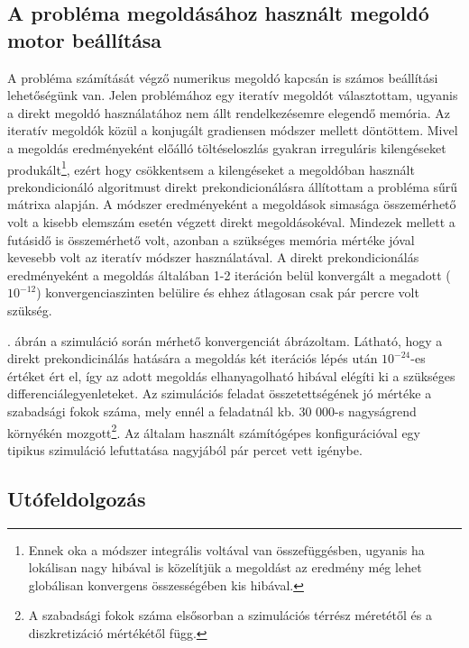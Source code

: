 \subsection{A probléma megoldásához használt megoldó motor beállítása}

A probléma számítását végző numerikus megoldó kapcsán is számos beállítási lehetőségünk van. Jelen problémához egy iteratív megoldót választottam, ugyanis a direkt megoldó használatához nem állt rendelkezésemre elegendő memória. Az iteratív megoldók közül a konjugált gradiensen módszer\cite{conjugate} mellett döntöttem. Mivel a megoldás eredményeként előálló töltéseloszlás gyakran irreguláris kilengéseket produkált\footnote{Ennek oka a módszer integrális voltával van összefüggésben, ugyanis ha lokálisan nagy hibával is közelítjük a megoldást az eredmény még lehet globálisan konvergens összességében kis hibával.}, ezért hogy csökkentsem a kilengéseket a megoldóban használt prekondicionáló algoritmust direkt prekondicionálásra állítottam a probléma sűrű mátrixa alapján. A módszer eredményeként a megoldások simasága összemérhető volt a kisebb elemszám esetén végzett direkt megoldásokéval. Mindezek mellett a futásidő is összemérhető volt, azonban a szükséges memória mértéke jóval kevesebb volt az iteratív módszer használatával. A direkt prekondicionálás eredményeként a megoldás általában 1-2 iteráción belül konvergált a megadott ($10^{-12}$) konvergenciaszinten belülire és ehhez átlagosan csak pár percre volt szükség.


. ábrán a szimuláció során mérhető konvergenciát ábrázoltam. Látható, hogy a direkt prekondicinálás hatására a megoldás két iterációs lépés után $10^{-24}$-es értéket ért el, így az adott megoldás elhanyagolható hibával elégíti ki a szükséges differenciálegyenleteket. Az szimulációs feladat összetettségének jó mértéke a szabadsági fokok száma, mely ennél a feladatnál kb. 30 000-s nagyságrend környékén mozgott\footnote{A szabadsági fokok száma elsősorban a szimulációs térrész méretétől és a diszkretizáció mértékétől függ.}. Az általam használt számítógépes konfigurációval egy tipikus szimuláció lefuttatása nagyjából pár percet vett igénybe.

\subsection{Utófeldolgozás}

